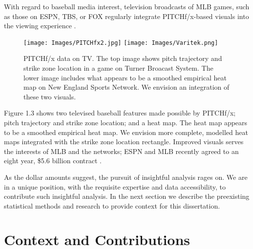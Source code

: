 With regard to baseball media interest, television broadcasts of MLB\textsuperscript{\textregistered} games, such as those on ESPN, TBS, or FOX regularly integrate PITCHf/x\textsuperscript{\textregistered}-based visuals into the viewing experience \citep{Cross2015}. 
        \begin{figure}[H]
      	\centering
      	\texttt{[image: Images/PITCHfx2.jpg]} 
      	\texttt{[image: Images/Varitek.png]} 
      	\caption{PITCHf/x\textsuperscript{\textregistered} data on TV. The top image shows pitch trajectory and strike zone location in a game on Turner Broacast System. The lower image includes what appears to be a smoothed empirical heat map on New England Sports Network. We envision an integration of these two visuals.}
      	\end{figure} 
Figure 1.3 shows two televised baseball features made possible by PITCHf/x\textsuperscript{\textregistered}; pitch trajectory and strike zone location; and a heat map. The heat map appears to be a smoothed empirical heat map. We envision more complete, modelled heat maps integrated with the strike zone location rectangle. Improved visuals serves the interests of MLB\textsuperscript{\textregistered} and the networks; ESPN\textsuperscript{\textregistered} and MLB\textsuperscript{\textregistered} recently agreed to an eight year, \$5.6 billion contract \citep{Newman2012}.

As the dollar amounts suggest, the pursuit of insightful analysis rages on. We are in a unique position, with the requisite expertise and data accessibility, to contribute such insightful analysis. In the next section we describe the preexisting statistical methods and research to provide context for this dissertation.


\section{Context and Contributions}


